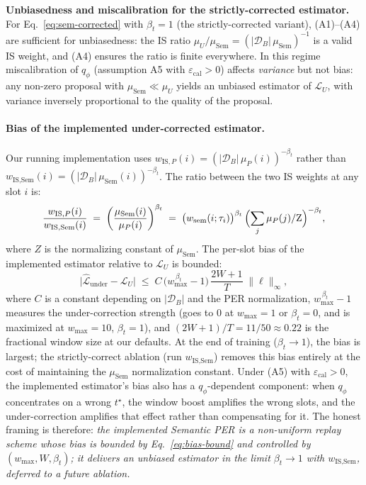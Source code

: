 \textbf{Unbiasedness and miscalibration for the strictly-corrected estimator.}
For Eq.~\eqref{eq:sem-corrected} with $\beta_t=1$ (the strictly-corrected
variant), (A1)--(A4) are sufficient for unbiasedness: the IS ratio
$\mu_U/\mu_{\text{Sem}} = (|\mathcal{D}_B|\,\mu_{\text{Sem}})^{-1}$ is a
valid IS weight, and (A4) ensures the ratio is finite everywhere.
In this regime miscalibration of $q_\phi$ (assumption A5 with $\varepsilon_{\text{cal}}>0$)
affects \emph{variance} but not bias: any non-zero proposal with $\mu_{\text{Sem}}\ll\mu_U$
yields an unbiased estimator of $\mathcal{L}_U$, with variance inversely proportional
to the quality of the proposal.

\paragraph{Bias of the implemented under-corrected estimator.}
Our running implementation uses $w_{\text{IS},P}(i)=(|\mathcal{D}_B|\,\mu_P(i))^{-\beta_t}$
rather than $w_{\text{IS},\text{Sem}}(i)=(|\mathcal{D}_B|\,\mu_{\text{Sem}}(i))^{-\beta_t}$.
The ratio between the two IS weights at any slot $i$ is:
\[
  \frac{w_{\text{IS},P}(i)}{w_{\text{IS},\text{Sem}}(i)}
  \;=\;
  \left(\frac{\mu_{\text{Sem}}(i)}{\mu_P(i)}\right)^{\beta_t}
  \;=\;
  \bigl(w_{\text{sem}}(i;\tau_i)\bigr)^{\beta_t}\,
  \Bigl(\sum_j \mu_P(j)/\text{Z}\Bigr)^{-\beta_t},
\]
where $Z$ is the normalizing constant of $\mu_{\text{Sem}}$.
The per-slot bias of the implemented estimator relative to $\mathcal{L}_U$ is
bounded:
\begin{equation}
  \bigl|\widehat{\mathcal{L}}_{\text{under}} - \mathcal{L}_U\bigr|
  \;\le\;
  C\,\bigl(w_{\max}^{\,\beta_t} - 1\bigr)\,\frac{2W+1}{T}
  \;\|\ell\|_\infty,
  \label{eq:bias-bound}
\end{equation}
where $C$ is a constant depending on $|\mathcal{D}_B|$ and the PER normalization,
$w_{\max}^{\,\beta_t}-1$ measures the under-correction strength (goes to 0 at
$w_{\max}=1$ or $\beta_t=0$, and is maximized at $w_{\max}\!=\!10$, $\beta_t\!=\!1$),
and $(2W+1)/T=11/50\approx 0.22$ is the fractional window size at our defaults.
At the end of training ($\beta_t\to 1$), the bias is largest; the strictly-correct
ablation (run $w_{\text{IS},\text{Sem}}$) removes this bias entirely at the
cost of maintaining the $\mu_{\text{Sem}}$ normalization constant.
Under (A5) with $\varepsilon_{\text{cal}}>0$, the implemented estimator's bias
also has a $q_\phi$-dependent component: when $q_\phi$ concentrates on a wrong
$t^\star$, the window boost amplifies the wrong slots, and the under-correction
amplifies that effect rather than compensating for it. The honest framing is
therefore: \emph{the implemented Semantic PER is a non-uniform replay scheme
whose bias is bounded by Eq.~\eqref{eq:bias-bound} and controlled by
$(w_{\max}, W, \beta_t)$; it delivers an unbiased estimator in the limit
$\beta_t\to 1$ with $w_{\text{IS},\text{Sem}}$, deferred to a future ablation.}

